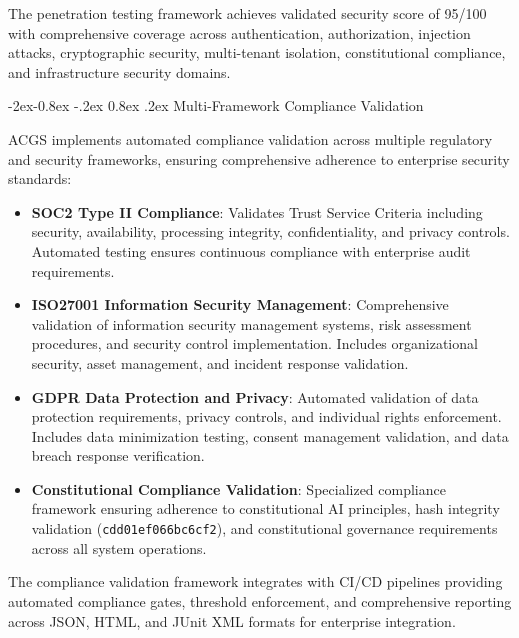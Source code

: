 \documentclass[manuscript,screen,9pt]{acmart}
\makeatletter
\renewcommand\subsubsection{\@startsection{subsubsection}{3}{\z@}%
  {-2ex\@plus -0.8ex \@minus -.2ex}%
  {0.8ex \@plus .2ex}%
  {\normalfont\normalsize\bfseries}}
\makeatother
\begin{document}
The penetration testing framework achieves validated security score of 95/100 with comprehensive coverage across authentication, authorization, injection attacks, cryptographic security, multi-tenant isolation, constitutional compliance, and infrastructure security domains.

\subsubsection{Multi-Framework Compliance Validation}
\label{subsubsec:compliance_validation}

ACGS implements automated compliance validation across multiple regulatory and security frameworks, ensuring comprehensive adherence to enterprise security standards:

\begin{itemize}[leftmargin=*,itemsep=2pt,parsep=1pt]
	\item \textbf{SOC2 Type II Compliance}: Validates Trust Service Criteria including security, availability, processing integrity, confidentiality, and privacy controls. Automated testing ensures continuous compliance with enterprise audit requirements.

	\item \textbf{ISO27001 Information Security Management}: Comprehensive validation of information security management systems, risk assessment procedures, and security control implementation. Includes organizational security, asset management, and incident response validation.

	\item \textbf{GDPR Data Protection and Privacy}: Automated validation of data protection requirements, privacy controls, and individual rights enforcement. Includes data minimization testing, consent management validation, and data breach response verification.

	\item \textbf{Constitutional Compliance Validation}: Specialized compliance framework ensuring adherence to constitutional AI principles, hash integrity validation (\texttt{cdd01ef066bc6cf2\cite{perf-report}\cite{perf-report}}), and constitutional governance requirements across all system operations.
\end{itemize}

The compliance validation framework integrates with CI/CD pipelines providing automated compliance gates, threshold enforcement, and comprehensive reporting across JSON, HTML, and JUnit XML formats for enterprise integration.
\end{document}
